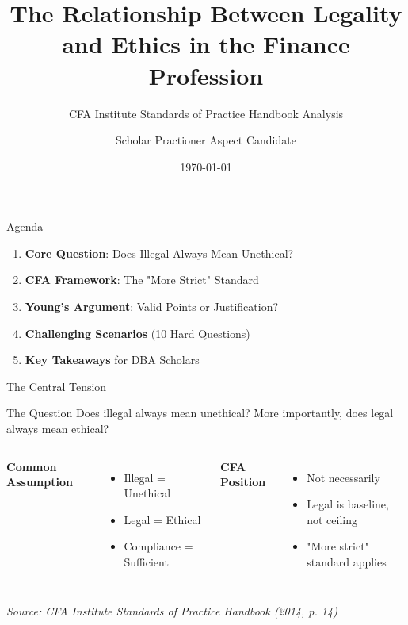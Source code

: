 \documentclass{beamer}
\title{The Relationship Between Legality and Ethics in the Finance Profession}
\subtitle{CFA Institute Standards of Practice Handbook Analysis}
\author{Scholar Practioner Aspect Candidate}
\date{\today}
\begin{document}
	
	\begin{frame}
		\titlepage
	\end{frame}
	
	\begin{frame}{Agenda}
		\begin{enumerate}
			\item \textbf{Core Question}: Does Illegal Always Mean Unethical?
			\item \textbf{CFA Framework}: The "More Strict" Standard
			\item \textbf{Young's Argument}: Valid Points or Justification?
			\item \textbf{Challenging Scenarios} (10 Hard Questions)
			\item \textbf{Key Takeaways} for DBA Scholars
		\end{enumerate}
	\end{frame}
	
	\begin{frame}{The Central Tension}
		\begin{block}{The Question}
			Does illegal always mean unethical? More importantly, does legal always mean ethical?
		\end{block}
		
		\begin{columns}
			\column{0.5\textwidth}
			\textbf{Common Assumption}
			\begin{itemize}
				\item Illegal = Unethical
				\item Legal = Ethical
				\item Compliance = Sufficient
			\end{itemize}
			
			\column{0.5\textwidth}
			\textbf{CFA Position}
			\begin{itemize}
				\item Not necessarily
				\item Legal is baseline, not ceiling
				\item \textcolor{cfablue}{"More strict" standard applies}
			\end{itemize}
		\end{columns}
		
		\vspace{0.3cm}
		\footnotesize \textit{Source: CFA Institute Standards of Practice Handbook (2014, p. 14)}
	\end{frame}
	
\end{document}
